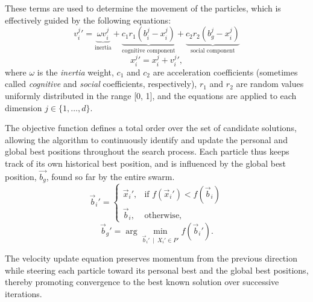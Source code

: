 {These terms are used to determine the movement of the particles, which is effectively guided by the following equations:
\begin{equation}\label{eq:velocity_update}
v_{i}^{j}{}'= \underbrace{\omega v_{i}^{j}}_{\text{inertia}} +
\underbrace{c_1 r_1 (b_{i}^{j} - x_{i}^{j})}_{\text{cognitive component}} +
\underbrace{c_2 r_2 (b_{g}^{j} - x_{i}^{j})}_{\ \ \text{social component}\ \ }
\end{equation}
\begin{equation}\label{eq:position_update}
x_{i}^{j}{}' = x_{i}^{j} + v_{i}^{j}{}',
\end{equation}
where $\omega$ is the \textit{inertia} weight, \(c_1\) and \(c_2\) are acceleration coefficients (sometimes called \textit{cognitive} and \textit{social} coefficients, respectively), \(r_1\) and \(r_2\) are random values uniformly distributed in the range [0, 1], and the equations are applied to each dimension  $j \in \{ 1,\ldots,d \}$.

The objective function defines a total order over the set of candidate solutions, allowing the algorithm to continuously identify and update the personal and global best positions throughout the search process. Each particle thus keeps track of its own historical best position, and is influenced by the global best position, 
\(\vec{b_g}\), found so far by the entire swarm.
\begin{equation}\label{eq:pbest_update}
\vec{b}_i' =
\begin{cases}
\vec{x}_i', & \text{if } f(\vec{x}_i') < f(\vec{b}_i) \\
\vec{b}_i, & \text{otherwise,}
\end{cases}
\end{equation}
\begin{equation}\label{eq:gbest_update}
\vec{b}_g' = \arg\min_{{\vec{b}_i'}\ \mid\ X_i' \in P'} f(\vec{b}_i').
\end{equation}



The velocity update equation preserves momentum from the previous direction while steering each particle toward its personal best and the global best positions, thereby promoting convergence to the best known solution over successive iterations.

}
